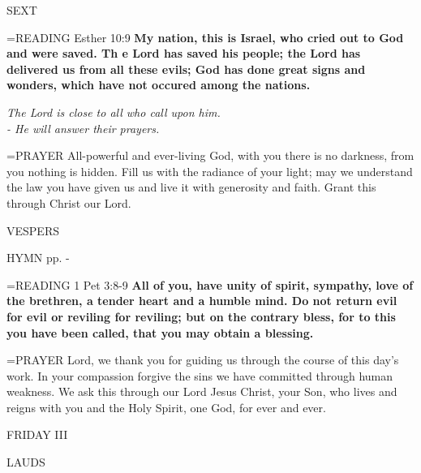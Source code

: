 \begin{flushleft}\normalsize SEXT\\\end{flushleft}

\hangindent=\parindent \small{READING} Esther 10:9 \textbf{My nation, this is Israel, who cried out to God and were saved. Th e Lord has saved his people; the Lord has delivered us from all these evils; God has done great signs and wonders, which have not occured among the nations.}

\begin{center}
\textit{The Lord is close to all who call upon him.\\
- He will answer their prayers.}
\end{center}

\hangindent=\parindent \small{PRAYER  All-powerful and ever-living God, with you there is no darkness, from you nothing is hidden. Fill us with the radiance of your light; may we understand the law you have given us and live it with generosity and faith. Grant this through Christ our Lord.}

\begin{flushleft}\normalsize VESPERS\\\end{flushleft}

HYMN pp. \pageref{ordinaryTime:fourthHymn} - \pageref{ordinaryTime:sixthHymn}

\hangindent=\parindent \small{READING} 1 Pet 3:8-9 \textbf{All of you, have unity of spirit, sympathy, love of the brethren, a tender heart and a humble mind. Do not return evil for evil or reviling for reviling; but on the contrary bless, for to this you have been called, that you may obtain a blessing.\\}

\hangindent=\parindent \small{PRAYER  Lord, we thank you for guiding us through the course of this day’s work. In your compassion forgive the sins we have committed through human weakness. We ask this through our Lord Jesus Christ, your Son, who lives and reigns with you and the Holy Spirit, one God, for ever and ever.}

\begin{center}
\normalsize FRIDAY III
\end{center}

\begin{flushleft}\normalsize LAUDS\\\end{flushleft}

